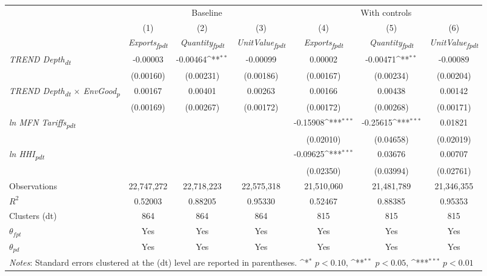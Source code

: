 {
\def\sym#1{\ifmmode^{#1}\else\(^{#1}\)\fi}
\begin{tabular}{l*{6}{c}}
\toprule
&\multicolumn{3}{c}{Baseline}&\multicolumn{3}{c}{With controls}\\\cmidrule(lr){2-4}\cmidrule(lr){5-7}
&(1)&(2)&(3)&(4)&(5)&(6)\\
&\textit{Exports\textsubscript{fpdt}}&\textit{Quantity\textsubscript{fpdt}}&\textit{UnitValue\textsubscript{fpdt}}&\textit{Exports\textsubscript{fpdt}}&\textit{Quantity\textsubscript{fpdt}}&\textit{UnitValue\textsubscript{fpdt}}\\
\midrule
\textit{TREND Depth\textsubscript{dt}} & -0.00003 & -0.00464\sym{**} & -0.00099 & 0.00002 & -0.00471\sym{**} & -0.00089\\
 & (0.00160) & (0.00231) & (0.00186) & (0.00167) & (0.00234) & (0.00204)\\
\addlinespace
\textit{TREND Depth\textsubscript{dt} $\times$ EnvGood\textsubscript{p}} & 0.00167 & 0.00401 & 0.00263 & 0.00166 & 0.00438 & 0.00142\\
 & (0.00169) & (0.00267) & (0.00172) & (0.00172) & (0.00268) & (0.00171)\\
\addlinespace
\textit{ln MFN Tariffs\textsubscript{pdt}} &  &  &  & -0.15908\sym{***} & -0.25615\sym{***} & 0.01821\\
 &  &  &  & (0.02010) & (0.04658) & (0.02019)\\
\addlinespace
\textit{ln HHI\textsubscript{pdt}} &  &  &  & -0.09625\sym{***} & 0.03676 & 0.00707\\
 &  &  &  & (0.02350) & (0.03994) & (0.02761)\\
\midrule
Observations & 22,747,272 & 22,718,223 & 22,575,318 & 21,510,060 & 21,481,789 & 21,346,355\\
$R^{2}$ & 0.52003 & 0.88205 & 0.95330 & 0.52467 & 0.88385 & 0.95353\\
Clusters (dt) & 864 & 864 & 864 & 815 & 815 & 815\\
$\theta_{fpt}$ & Yes & Yes & Yes & Yes & Yes & Yes\\
$\theta_{pd}$ & Yes & Yes & Yes & Yes & Yes & Yes\\
\bottomrule
\multicolumn{7}{l}{\footnotesize \textit{Notes}: Standard errors clustered at the (dt) level are reported in parentheses. \sym{*} \(p<0.10\), \sym{**} \(p<0.05\), \sym{***} \(p<0.01\)}\\
\end{tabular}
}
